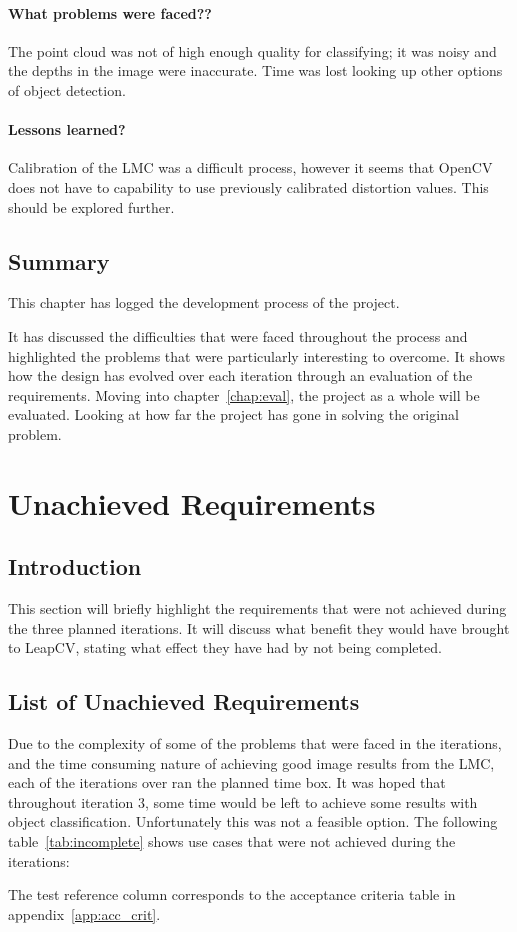 \documentclass[11pt,oneside]{report}
\begin{document}
			\subsubsection{What problems were faced??}
			The point cloud was not of high enough quality for classifying; it was noisy and the depths in the image were inaccurate.
			Time was lost looking up other options of object detection.
			\subsubsection{Lessons learned?}
			Calibration of the LMC was a difficult process, however it seems that OpenCV does not have to capability to use previously calibrated distortion values.
			This should be explored further.
		
	\section{Summary}
	This chapter has logged the development process of the project.
	
	It has discussed the difficulties that were faced throughout the process and highlighted the problems that were particularly interesting to overcome.
	It shows how the design has evolved over each iteration through an evaluation of the requirements.
	Moving into chapter~\ref{chap:eval}, the project as a whole will be evaluated.
	Looking at how far the project has gone in solving the original problem.

	\chapter{Unachieved Requirements}
		\section{Introduction}
		This section will briefly highlight the requirements that were not achieved during the three planned iterations.
		It will discuss  what benefit they would have brought to LeapCV, stating what effect they have had by not being completed.
		
		\section{List of Unachieved Requirements}
			Due to the complexity of some of the problems that were faced in the iterations, and the time consuming nature of achieving good image results from the LMC, each of the iterations over ran the planned time box.
			It was hoped that throughout iteration 3, some time would be left to achieve some results with object classification.
			Unfortunately this was not a feasible option.
			The following table~\ref{tab:incomplete} shows use cases that were not achieved during the iterations:
			
			The test reference column corresponds to the acceptance criteria table in appendix~\ref{app:acc_crit}.
			
\end{document}
